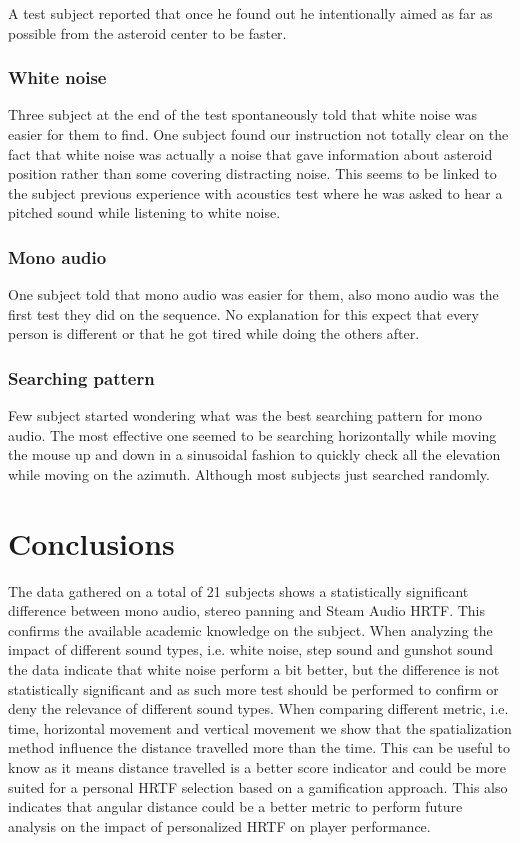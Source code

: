 \documentclass[conference]{IEEEtran}
\begin{document}
A test subject reported that once he found out he intentionally aimed as far as possible from the asteroid center to be faster.\\

\subsubsection{White noise}
Three subject at the end of the test spontaneously told that white noise was easier for them to find.
One subject found our instruction not totally clear on the fact that white noise was actually a noise that gave information about asteroid position rather than some covering distracting noise. This seems to be linked to the subject previous experience with acoustics test where he was asked to hear a pitched sound while listening to white noise.\\

\subsubsection{Mono audio}
One subject told that mono audio was easier for them, also mono audio was the first test they did on the sequence. No explanation for this expect that every person is different or that he got tired while doing the others after.\\

\subsubsection{Searching pattern}
Few subject started wondering what was the best searching pattern for mono audio. The most effective one seemed to be searching horizontally while moving the mouse up and down in a sinusoidal fashion to quickly check all the elevation while moving on the azimuth. Although most subjects just searched randomly.

\section{Conclusions}
The data gathered on a total of 21 subjects shows a statistically significant difference between mono audio, stereo panning and Steam Audio HRTF. This confirms the available academic knowledge on the subject.
When analyzing the impact of different sound types, i.e. white noise, step sound and gunshot sound the data indicate that white noise perform a bit better, but the difference is not statistically significant and as such more test should be performed to confirm or deny the relevance of different sound types.
When comparing different metric, i.e. time, horizontal movement and vertical movement we show that the spatialization method influence the distance travelled more than the time. This can be useful to know as it means distance travelled is a better score indicator and could be more suited for a personal HRTF selection based on a gamification approach.
This also indicates that angular distance could be a better metric to perform future analysis on the impact of personalized HRTF on player performance.
\end{document}
